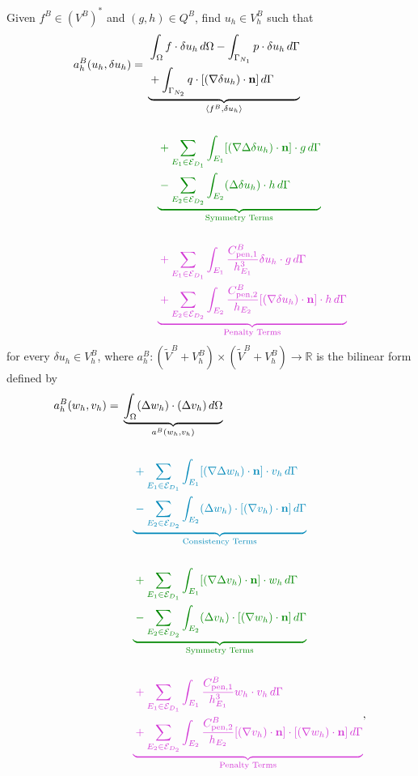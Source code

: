 \documentclass[11pt,a4paper]{article}
\begin{document}
Given $f^B\in(V^B)^*$ and $(g,h)\in Q^B$, find $u_h\in V_h^B$ such that
\begin{align*}
a_h^B(u_h,\delta u_h)
={}&
\underbrace{
\begin{aligned}
&\int_\Omega f\cdot\delta u_h\,d\Omega
-\int_{\Gamma_{N_1}}p\cdot\delta u_h\,d\Gamma\\
&+\int_{\Gamma_{N_2}}q\cdot[(\nabla\delta u_h)\cdot\mathbf n]\,d\Gamma
\end{aligned}
}_{\langle f^B,\delta u_h\rangle}\\[1.5em]
&\quad
\textcolor{NitscheGreen}{
\underbrace{
\begin{aligned}
&+\sum_{E_1\in\mathcal E_{D_1}}\int_{E_1}
[(\nabla\Delta\delta u_h)\cdot\mathbf n]\cdot g\,d\Gamma\\
&-\sum_{E_2\in\mathcal E_{D_2}}\int_{E_2}
(\Delta\delta u_h)\cdot h\,d\Gamma
\end{aligned}
}_{\text{Symmetry Terms}}}\\[1.5em]
&\quad
\textcolor{NitscheMagenta}{
\underbrace{
\begin{aligned}
&+\sum_{E_1\in\mathcal E_{D_1}}\int_{E_1}
\frac{C_{\mathrm{pen},1}^B}{h_{E_1}^3}
\delta u_h\cdot g\,d\Gamma\\
&+\sum_{E_2\in\mathcal E_{D_2}}\int_{E_2}
\frac{C_{\mathrm{pen},2}^B}{h_{E_2}}
[(\nabla\delta u_h)\cdot\mathbf n]\cdot h\,d\Gamma
\end{aligned}
}_{\text{Penalty Terms}}}
\end{align*}
for every $\delta u_h\in V_h^B$, where
$a_h^B:(\widetilde V^B+V_h^B)\times(\widetilde V^B+V_h^B)\to\mathbb R$
is the bilinear form defined by
\begin{align*}
a_h^B(w_h,v_h)
={}&
\underbrace{
\int_\Omega(\Delta w_h)\cdot(\Delta v_h)\,d\Omega
}_{a^B(w_h,v_h)}\\[1.5em]
&\quad
\textcolor{NitscheBlue}{
\underbrace{
\begin{aligned}
&+\sum_{E_1\in\mathcal E_{D_1}}\int_{E_1}
[(\nabla\Delta w_h)\cdot\mathbf n]\cdot v_h\,d\Gamma\\
&-\sum_{E_2\in\mathcal E_{D_2}}\int_{E_2}
(\Delta w_h)\cdot[(\nabla v_h)\cdot\mathbf n]\,d\Gamma
\end{aligned}
}_{\text{Consistency Terms}}}\\[1.5em]
&\quad
\textcolor{NitscheGreen}{
\underbrace{
\begin{aligned}
&+\sum_{E_1\in\mathcal E_{D_1}}\int_{E_1}
[(\nabla\Delta v_h)\cdot\mathbf n]\cdot w_h\,d\Gamma\\
&-\sum_{E_2\in\mathcal E_{D_2}}\int_{E_2}
(\Delta v_h)\cdot[(\nabla w_h)\cdot\mathbf n]\,d\Gamma
\end{aligned}
}_{\text{Symmetry Terms}}}\\[1.5em]
&\quad
\textcolor{NitscheMagenta}{
\underbrace{
\begin{aligned}
&+\sum_{E_1\in\mathcal E_{D_1}}\int_{E_1}
\frac{C_{\mathrm{pen},1}^B}{h_{E_1}^3}
w_h\cdot v_h\,d\Gamma\\
&+\sum_{E_2\in\mathcal E_{D_2}}\int_{E_2}
\frac{C_{\mathrm{pen},2}^B}{h_{E_2}}
[(\nabla v_h)\cdot\mathbf n]
\cdot[(\nabla w_h)\cdot\mathbf n]\,d\Gamma
\end{aligned}
}_{\text{Penalty Terms}}},
\end{align*}
\end{document}
